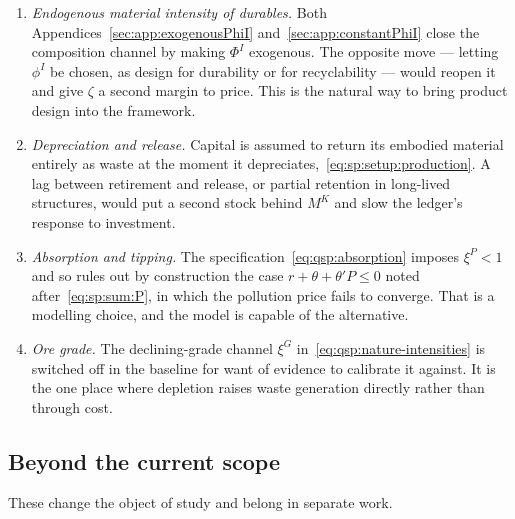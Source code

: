 \begin{enumerate}[leftmargin=2.2em,itemsep=0.25em]
\item \emph{Endogenous material intensity of durables.} Both
Appendices~\ref{sec:app:exogenousPhiI} and~\ref{sec:app:constantPhiI} close the composition channel by
making $\Phi^I$ exogenous. The opposite move --- letting $\phi^I$ be chosen, as design for durability
or for recyclability --- would reopen it and give $\zeta$ a second margin to price. This is the natural
way to bring product design into the framework.

\item \emph{Depreciation and release.} Capital is assumed to return its embodied material entirely as
waste at the moment it depreciates,~\eqref{eq:sp:setup:production}. A lag between retirement and
release, or partial retention in long-lived structures, would put a second stock behind
$M^K$ and slow the ledger's response to investment.

\item \emph{Absorption and tipping.} The specification~\eqref{eq:qsp:absorption} imposes $\xi^P<1$ and
so rules out by construction the case $r+\theta+\theta'P\le0$ noted after~\eqref{eq:sp:sum:P}, in
which the pollution price fails to converge. That is a modelling choice, and the model is capable of
the alternative.

\item \emph{Ore grade.} The declining-grade channel $\xi^G$ in~\eqref{eq:qsp:nature-intensities} is
switched off in the baseline for want of evidence to calibrate it against. It is the one place where
depletion raises waste generation directly rather than through cost.
\end{enumerate}

\subsection{Beyond the current scope}\label{sec:app:ext:scope}

These change the object of study and belong in separate work.

